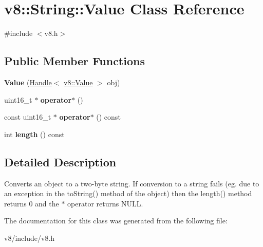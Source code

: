 \hypertarget{classv8_1_1String_1_1Value}{\section{v8\-:\-:String\-:\-:Value Class Reference}
\label{classv8_1_1String_1_1Value}
}


{\ttfamily \#include $<$v8.\-h$>$}

\subsection*{Public Member Functions}
\begin{DoxyCompactItemize}
\item 
\hypertarget{classv8_1_1String_1_1Value_a9d6a6d258196a0a34ac257b2abaf659a}{{\bfseries Value} (\hyperlink{classv8_1_1Handle}{Handle}$<$ \hyperlink{classv8_1_1Value}{v8\-::\-Value} $>$ obj)}\label{classv8_1_1String_1_1Value_a9d6a6d258196a0a34ac257b2abaf659a}

\item 
\hypertarget{classv8_1_1String_1_1Value_ae4f44b1977968de2e9f2ff703437fde3}{uint16\-\_\-t $\ast$ {\bfseries operator$\ast$} ()}\label{classv8_1_1String_1_1Value_ae4f44b1977968de2e9f2ff703437fde3}

\item 
\hypertarget{classv8_1_1String_1_1Value_a1cf21001f92284f290a6e550d567e757}{const uint16\-\_\-t $\ast$ {\bfseries operator$\ast$} () const }\label{classv8_1_1String_1_1Value_a1cf21001f92284f290a6e550d567e757}

\item 
\hypertarget{classv8_1_1String_1_1Value_a4b5014d7d4d0f60d39f37e421ae2eb91}{int {\bfseries length} () const }\label{classv8_1_1String_1_1Value_a4b5014d7d4d0f60d39f37e421ae2eb91}

\end{DoxyCompactItemize}


\subsection{Detailed Description}
Converts an object to a two-\/byte string. If conversion to a string fails (eg. due to an exception in the to\-String() method of the object) then the length() method returns 0 and the $\ast$ operator returns N\-U\-L\-L. 

The documentation for this class was generated from the following file\-:\begin{DoxyCompactItemize}
\item 
v8/include/v8.\-h\end{DoxyCompactItemize}
